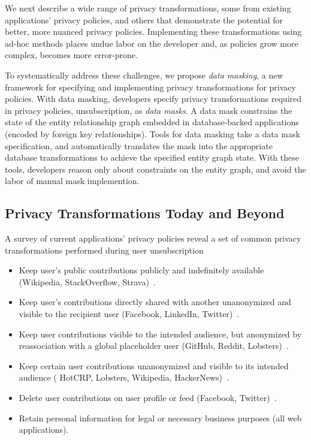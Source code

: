 We next describe a wide range of privacy transformations, some from existing applications' privacy policies,
and others that demonstrate the potential for better, more nuanced privacy policies. Implementing
these transformations using ad-hoc methods places undue labor on the developer and, as policies grow
more complex, becomes more error-prone.

To systematically address these challenges, we propose \emph{data masking}, a new framework for
specifying and implementing privacy transformations for privacy policies.
%
With data masking, developers specify privacy transformations required in privacy policies, \eg
unsubscription, as \emph{data masks}. A data mask constrains the state of the entity relationship
graph embedded in database-backed applications (\eg encoded by foreign key relationships).
%
Tools for data masking take a data mask specification, and automatically translates the mask into
the appropriate database transformations to achieve the specified entity graph state. With these
tools, developers reason only about constraints on the entity graph, and avoid the labor of manual
mask implemention.

\subsection{Privacy Transformations Today and Beyond}
A survey of current applications' privacy policies reveal a set of common privacy transformations performed during user unsubscription
\begin{itemize}[nosep]
    \item Keep user's public contributions publicly and indefinitely available (\eg Wikipedia,
        StackOverflow, Strava)~\cite{wikipedia:privacy, stackoverflow:privacy, strava:privacy}.
    \item Keep user's contributions directly shared with another unanonymized and visible to the recipient user (\eg Facebook,
        LinkedIn, Twitter)~\cite{twitter:privacy, facebook:privacy, linkedin:privacy}.
    \item Keep user contributions visible to the intended audience, but anonymized by reassociation with a global
        placeholder user (\eg GitHub, Reddit, Lobsters)~\cite{github:privacy, reddit:privacy,
        lobsters:privacy}.
    \item Keep certain user contributions unanonymized and visible to its intended audience (\eg
        HotCRP, Lobsters, Wikipedia, HackerNews)~\cite{hotcrp:privacy, lobsters:privacy,
        hackernews:privacy, wikipedia:privacy}.
    \item Delete user contributions on user profile or feed (\eg Facebook,
        Twitter)~\cite{facebook:privacy, twitter:privacy}.
    \item Retain personal information for legal or necessary business purposes (all web applications).
\end{itemize}

